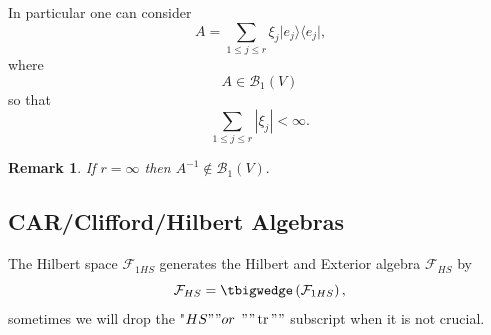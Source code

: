 \documentclass[aps, preprint]{revtex4}
\newtheorem{remark}[theorem]{Remark}
\begin{document}
In particular one can consider
\begin{equation}A =\sum _{1 \leq j \leq r}\xi _{j}\vert e_{j} \rangle  \langle e_{j}\vert \text{,}
\end{equation}where
\begin{equation}A \in \mathcal{B}_{1} \left (V\right )
\end{equation}so that
\begin{equation}\sum _{1 \leq j \leq r}\left \vert \xi _{j}\right \vert  <\infty \text{.}
\end{equation}


\begin{remark}
If $r =\infty $ then $A^{ -1} \notin \mathcal{B}_{1} \left (V\right )\text{.}$ 
\end{remark}

\subsection{CAR/Clifford/Hilbert Algebras}
The Hilbert space $\mathcal{F}_{1 H S}$ generates the Hilbert and Exterior algebra $\mathcal{F}_{H S}$ by
\begin{equation}\mathcal{F}_{H S} = \tbigwedge \left (\mathcal{F}_{1 H S}\right )\text{,}
\end{equation}sometimes we will drop the "$H S "" o r$ $"" \ensuremath{\operatorname*{tr}}""$ subscript when it is not crucial. 
\end{document}
